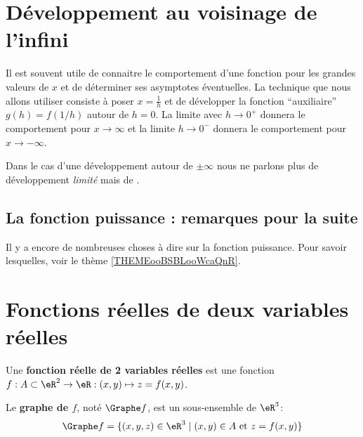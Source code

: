 \section{Développement au voisinage de l'infini}

Il est souvent utile de connaitre le comportement d'une fonction pour les grandes valeurs de \( x\) et de déterminer ses asymptotes éventuelles. La technique que nous allons utiliser consiste à poser \( x=\frac{1}{ h }\) et de développer la fonction ``auxiliaire'' $g(h) = f(1/h)$ autour de \( h=0\). La limite avec \( h\to 0^+\) donnera le comportement pour \( x\to \infty\) et la limite \( h\to 0^-\) donnera le comportement pour \( x\to -\infty\).

Dans le cas d'une développement autour de \( \pm\infty\) nous ne parlons plus de développement \emph{limité} mais de .

\subsection{La fonction puissance : remarques pour la suite}

Il y a encore de nombreuses choses à dire sur la fonction puissance. Pour savoir lesquelles, voir le thème \ref{THEMEooBSBLooWcaQnR}.

\section{Fonctions réelles de deux variables réelles}

Une \textbf{fonction réelle de 2 variables réelles} est une fonction $f : A \subset \eR^2 \to \eR : (x,y) \mapsto z = f(x,y)$.

Le \textbf{graphe de $f$}, noté $\Graphe f$, est un sous-ensemble de $\eR^3$:\[\Graphe f = \{(x,y,z) \in \eR^3 \mid (x,y) \in A \text{ et } z = f(x,y)\}\]

